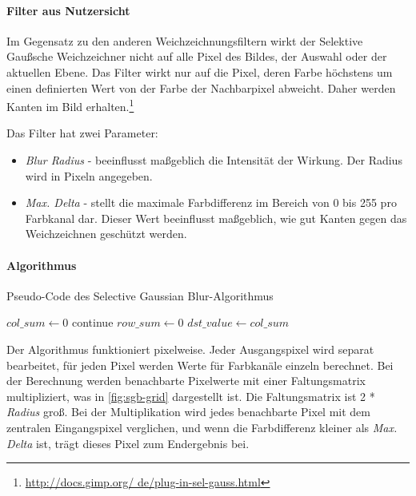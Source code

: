\paragraph{Filter aus Nutzersicht}
\glqq Im Gegensatz zu den anderen Weichzeichnungsfiltern wirkt der Selektive Gaußsche Weichzeichner nicht auf alle Pixel des Bildes, der Auswahl oder der aktuellen Ebene. Das Filter wirkt nur auf die Pixel, deren Farbe höchstens um einen definierten Wert von der Farbe der Nachbarpixel abweicht. Daher werden Kanten im Bild erhalten.\glqq\footnote{\url{http://docs.gimp.org/	de/plug-in-sel-gauss.html}} 

Das Filter hat zwei Parameter: 
\begin{itemize}
\item \emph{Blur Radius} - beeinflusst maßgeblich die Intensität der Wirkung. Der Radius wird in Pixeln angegeben.
\item \emph{Max. Delta} - stellt die maximale Farbdifferenz im Bereich von 0 bis 255 pro Farbkanal dar. Dieser Wert beeinflusst maßgeblich, wie gut Kanten
gegen das Weichzeichnen geschützt werden.
\end{itemize}


\paragraph{Algorithmus} 
\begin{algorithm}[h]
\caption{Pseudo-Code des \glqq Selective Gaussian Blur\grqq-Algorithmus}
\label{algo:sel-gaussian}
\begin{algorithmic}[1]
		\State $col\_sum \gets 0$
			\State continue
			\EndIf
			\State $row\_sum \gets 0$
				\EndIf
				\EndIf
			\EndFor
		\EndFor
		\State $dst\_value \gets col\_sum$
	\EndFor
	\EndFor
\EndFor	
\end{algorithmic}
\end{algorithm}

Der Algorithmus funktioniert pixelweise. Jeder Ausgangspixel wird separat bearbeitet, für jeden Pixel werden Werte für Farbkanäle einzeln berechnet. Bei der Berechnung werden benachbarte Pixelwerte mit einer Faltungsmatrix multipliziert, was in \autoref{fig:sgb-grid} dargestellt ist. Die Faltungsmatrix ist 2 * \emph{Radius} groß. Bei der Multiplikation wird jedes benachbarte Pixel mit dem zentralen Eingangspixel verglichen, und wenn die Farbdifferenz kleiner als \emph{Max. Delta} ist, trägt dieses Pixel zum Endergebnis bei. 

